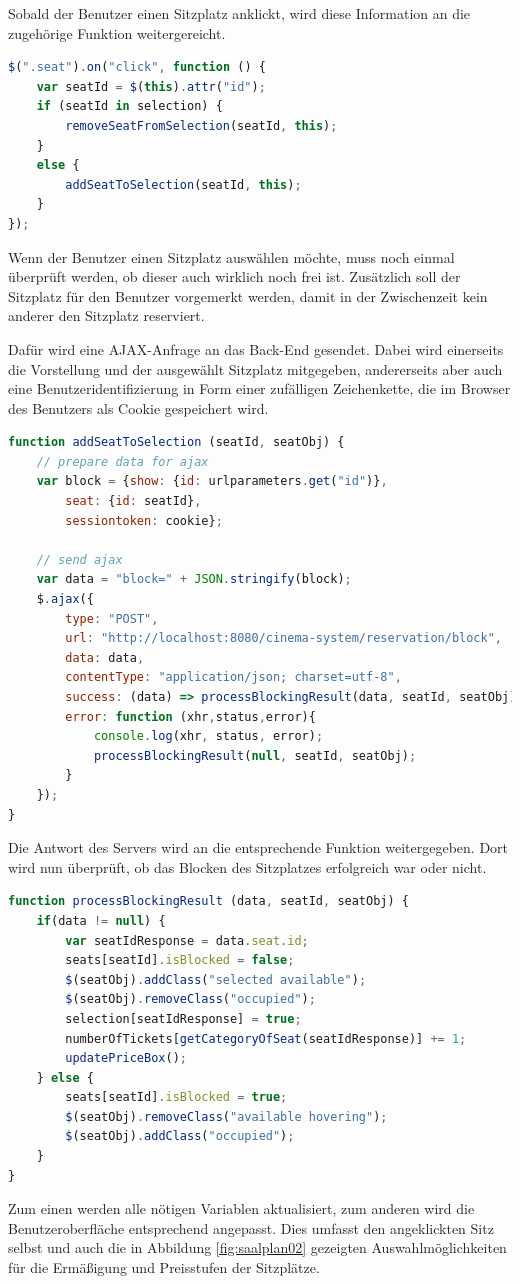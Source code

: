 Sobald der Benutzer einen Sitzplatz anklickt, wird diese Information an die zugehörige Funktion weitergereicht.

\begin{lstlisting}[language=JavaScript, caption={Erkennen des Anklickens eines Sitzplatzes}, label={lst:js_onclick}]
$(".seat").on("click", function () {
	var seatId = $(this).attr("id");
	if (seatId in selection) {
		removeSeatFromSelection(seatId, this);
	}
	else {
		addSeatToSelection(seatId, this);
	}
});
\end{lstlisting}

Wenn der Benutzer einen Sitzplatz auswählen möchte, muss noch einmal überprüft werden, ob dieser auch wirklich noch frei ist.
Zusätzlich soll der Sitzplatz für den Benutzer vorgemerkt werden, damit in der Zwischenzeit kein anderer den Sitzplatz reserviert.

Dafür wird eine \acs{AJAX}-Anfrage an das Back-End gesendet.
Dabei wird einerseits die Vorstellung und der ausgewählt Sitzplatz mitgegeben, andererseits aber auch eine Benutzeridentifizierung in Form einer zufälligen Zeichenkette, die im Browser des Benutzers als Cookie gespeichert wird.

\begin{lstlisting}[language=JavaScript, caption={Senden einer Anfrage, den Sitzplatz zu blocken}, label={lst:js_ajax_send_block}]
function addSeatToSelection (seatId, seatObj) {
	// prepare data for ajax
	var block = {show: {id: urlparameters.get("id")},
		seat: {id: seatId},
		sessiontoken: cookie};

	// send ajax
	var data = "block=" + JSON.stringify(block);
	$.ajax({
		type: "POST",
		url: "http://localhost:8080/cinema-system/reservation/block",
		data: data,
		contentType: "application/json; charset=utf-8",
		success: (data) => processBlockingResult(data, seatId, seatObj),
		error: function (xhr,status,error){
			console.log(xhr, status, error);
			processBlockingResult(null, seatId, seatObj);
		}
	});
}
\end{lstlisting}

Die Antwort des Servers wird an die entsprechende Funktion weitergegeben.
Dort wird nun überprüft, ob das Blocken des Sitzplatzes erfolgreich war oder nicht.

\begin{lstlisting}[language=JavaScript, caption={Verarbeiten der Server-Antwort beim Versuch, einen Platz zu blocken}, label={lst:js_ajax_process_block}]
function processBlockingResult (data, seatId, seatObj) {
	if(data != null) {
		var seatIdResponse = data.seat.id;
		seats[seatId].isBlocked = false;
		$(seatObj).addClass("selected available");
		$(seatObj).removeClass("occupied");
		selection[seatIdResponse] = true;
		numberOfTickets[getCategoryOfSeat(seatIdResponse)] += 1;
		updatePriceBox();
	} else {
		seats[seatId].isBlocked = true;
		$(seatObj).removeClass("available hovering");
		$(seatObj).addClass("occupied");
	}
}
\end{lstlisting}

Zum einen werden alle nötigen Variablen aktualisiert, zum anderen wird die Benutzeroberfläche entsprechend angepasst.
Dies umfasst den angeklickten Sitz selbst und auch die in Abbildung \vref{fig:saalplan02} gezeigten Auswahlmöglichkeiten für die Ermäßigung und Preisstufen der Sitzplätze.
